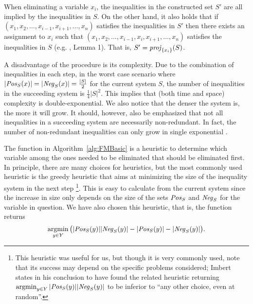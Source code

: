 When eliminating a variable $x_i$, the inequalities in the constructed set $S'$ are all implied by the inequalities in $S$. On the other hand, it also holds that if $(x_1, x_2, \ldots, x_{i-1}, x_{i+1}, \ldots, x_n)$ satisfies the inequalities in $S'$ then there exists an assignment to $x_i$ such that $(x_1, x_2, \ldots, x_{i-1}, x_i, x_{i+1}, \ldots, x_n)$ satisfies the inequalities in $S$ {(e.g. \cite{duffin74}, Lemma 1)}. That is, $S' = \mathit{proj}_{\{x_i\}}(S)$.

A disadvantage of the procedure is its complexity. Due to the combination of inequalities in each step, in the worst case scenario where $|\mathit{Pos}_S(x)| = |\mathit{Neg}_S(x)| = \frac{|S|}{2}$ for the current system $S$, the number of inequalities in the succeeding system is $\frac{1}{4}|S|^2$. This implies that (both time and space) complexity is double-exponential.  
We also notice that the denser the system is, the more it will grow. 
It should, however, also be emphasized that not all inequalities in a succeeding system are necessarily non-redundant. In fact, the
number of non-redundant inequalities can only grow in single exponential \cite{Monniaux10}.

The function  in Algorithm~\ref{alg:FMBasic} is a heuristic to determine which variable among the ones needed to be eliminated that should be eliminated first. In principle, there are many choices for heuristics, but the most commonly used heuristic is the greedy heuristic that aims at minimizing the size of the inequality system in the next step \cite{duffin74}\footnote{This heuristic was useful for us, but though it is very commonly used, note that its success may depend on the specific problems considered; Imbert \cite{imbert93} states in his conclusion to have found the related heuristic returning $\argmin_{y\in Y}|\Pos_S(y)||\Neg_S(y)|$ to be inferior to ``any other choice, even at random''.}. This is easy to calculate from the current system since the increase in size only depends on the size of the sets $\mathit{Pos}_S$ and $\mathit{Neg}_S$ for the variable in question. We have also chosen this heuristic, that is, the function  returns 
\[
\argmin_{y\in Y}\big(|\Pos_S(y)||\Neg_S(y)| - |\Pos_S(y)|-|\Neg_S(y)|\big).
\] 
%
%
